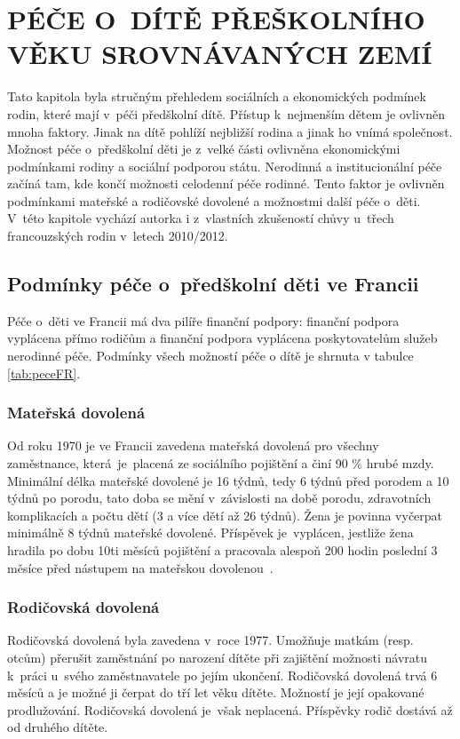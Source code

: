 \chapter{PÉČE O~DÍTĚ PŘEŠKOLNÍHO VĚKU SROVNÁVANÝCH ZEMÍ}

	Tato kapitola byla stručným přehledem sociálních a ekonomických podmínek rodin, které mají v péči předškolní dítě. Přístup k nejmenším dětem je ovlivněn mnoha faktory. Jinak na dítě pohlíží nejbližší rodina a jinak ho vnímá společnost. Možnost péče o~předškolní děti je z velké části ovlivněna ekonomickými podmínkami rodiny a sociální podporou státu. Nerodinná a institucionální péče začíná tam, kde končí možnosti celodenní péče rodinné. Tento faktor je ovlivněn podmínkami mateřské a rodičovské dovolené a možnostmi další péče o~děti. V~této kapitole vychází autorka i z~vlastních zkušeností chůvy u~třech francouzských rodin v~letech 2010/2012.

		\section{Podmínky péče o~předškolní děti ve Francii}
		Péče o~děti ve Francii má dva pilíře finanční podpory: finanční podpora vyplácena přímo rodičům a finanční podpora vyplácena poskytovatelům služeb nerodinné péče. Podmínky všech možností péče o dítě je shrnuta v tabulce \ref{tab:peceFR}.


			\subsection{Mateřská dovolená}
				Od roku 1970 je ve Francii zavedena mateřská dovolená pro všechny zaměstnance, která je placená ze sociálního pojištění a činí 90 \% hrubé mzdy. Minimální délka mateřské dovolené je 16 týdnů, tedy 6 týdnů před porodem a 10 týdnů po porodu, tato doba se mění v závislosti na době porodu, zdravotních komplikacích a počtu dětí (3 a více dětí až 26 týdnů). Žena je povinna vyčerpat minimálně 8 týdnů mateřské dovolené. Příspěvek je vyplácen, jestliže žena hradila po dobu 10ti měsíců pojištění a pracovala alespoň 200 hodin poslední 3 měsíce před nástupem na mateřskou dovolenou~\citep{Dennipece}.

			\subsection{Rodičovská dovolená}
				Rodičovská dovolená byla zavedena v roce 1977. Umožňuje matkám (resp. otcům) přerušit zaměstnání po narození dítěte při zajištění možnosti návratu k práci u~svého zaměstnavatele po jejím ukončení. Rodičovská dovolená trvá 6 měsíců a je možné ji čerpat do tří let věku dítěte. Možností je její opakované prodlužování. Rodičovská dovolená je však neplacená. Příspěvky rodič dostává až od druhého dítěte. 

